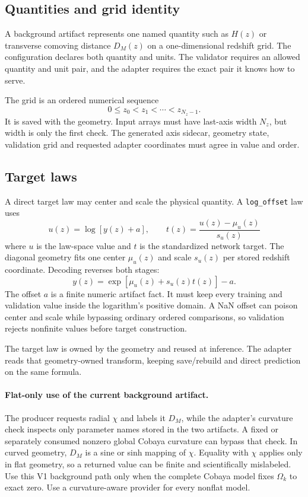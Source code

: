 \documentclass[10pt,aps,prd,twocolumn,nofootinbib]{revtex4-2}
\newcommand{\code}[1]{\texttt{#1}}
\begin{document}
\subsection{Quantities and grid identity}

A background artifact represents one named quantity such as \(H(z)\) or
transverse comoving distance \(D_M(z)\) on a one-dimensional redshift grid.
The configuration declares both quantity and units.  The validator requires
an allowed quantity and unit pair, and the adapter requires the exact pair it
knows how to serve.

The grid is an ordered numerical sequence
\begin{equation*}
  0\le z_0<z_1<\cdots<z_{N_z-1}.
\end{equation*}
It is saved with the geometry.  Input arrays must have last-axis width
\(N_z\), but width is only the first check.  The generated axis sidecar,
geometry state, validation grid and requested adapter coordinates must agree
in value and order.

\subsection{Target laws}

A direct target law may center and scale the physical quantity.  A
\code{log\_offset} law uses
\begin{equation*}
  u(z)=\log\!\left[y(z)+a\right],\qquad
  t(z)=\frac{u(z)-\mu_u(z)}{s_u(z)}
\end{equation*}
where $u$ is the law-space value and $t$ is the standardized network target.
The diagonal geometry fits one center $\mu_u(z)$ and scale $s_u(z)$ per stored
redshift coordinate.  Decoding reverses both stages:
\begin{equation*}
  y(z)=\exp\!\left[\mu_u(z)+s_u(z)t(z)\right]-a.
\end{equation*}
The offset \(a\) is a finite numeric artifact fact.  It must keep every
training and validation value inside the logarithm's positive domain.  A NaN
offset can poison center and scale while bypassing ordinary ordered
comparisons, so validation rejects nonfinite values before target
construction.

The target law is owned by the geometry and reused at inference.  The adapter
reads that geometry-owned transform, keeping save/rebuild and direct
prediction on the same formula.

\paragraph{Flat-only use of the current background artifact.}
The producer requests radial $\chi$ and labels it $D_M$, while the adapter's
curvature check inspects only parameter names stored in the two artifacts.  A
fixed or separately consumed nonzero global Cobaya curvature can bypass that
check.  In curved geometry, $D_M$ is a sine or sinh mapping of $\chi$.
Equality with $\chi$ applies only in flat geometry, so a returned value can be
finite and scientifically mislabeled.  Use this V1 background path only when
the complete Cobaya model fixes $\Omega_k$ to exact zero.  Use a
curvature-aware provider for every nonflat model.
\end{document}
